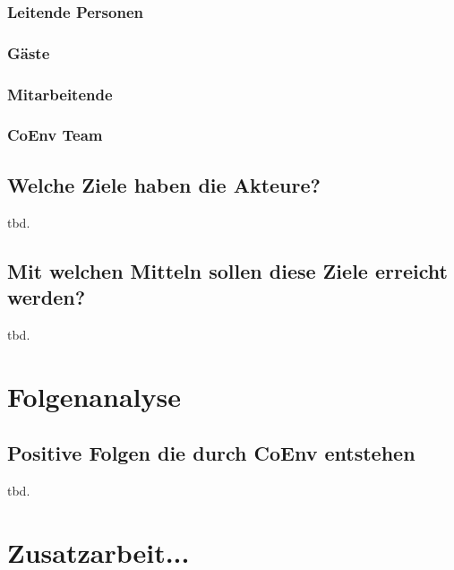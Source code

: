 \documentclass{article}
\begin{document}
\subsubsection{Leitende Personen}
\subsubsection{Gäste}
\subsubsection{Mitarbeitende}
\subsubsection{CoEnv Team}

\subsection{Welche Ziele haben die Akteure?}

tbd.

\subsection{Mit welchen Mitteln sollen diese Ziele erreicht werden?}

tbd.

\section{Folgenanalyse}

\subsection{Positive Folgen die durch CoEnv entstehen}

tbd.

\section{Zusatzarbeit...}

% 
% 
\end{document}
